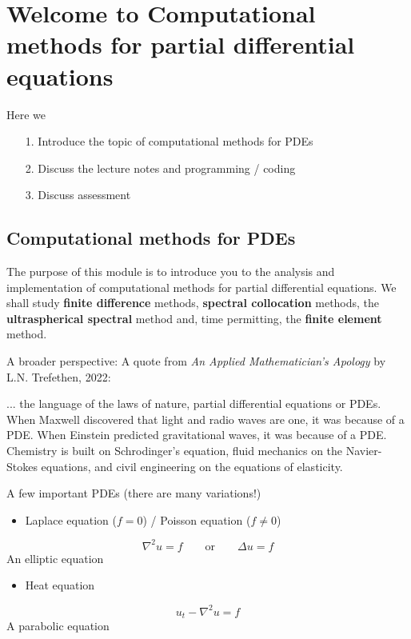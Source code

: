 \documentclass[12pt,a4paper]{article}
\begin{document}
\section{Welcome to Computational methods for partial differential equations}
Here we

\begin{itemize}
\item[1. ] Introduce the topic of computational methods for PDEs


\item[2. ] Discuss the lecture notes and programming / coding


\item[3. ] Discuss assessment

\end{itemize}
\subsection{Computational methods for PDEs}
The purpose of this module is to introduce you to the analysis and implementation of computational methods for partial differential equations.  We shall study \textbf{finite difference} methods, \textbf{spectral collocation} methods, the \textbf{ultraspherical spectral} method and, time permitting, the \textbf{finite element} method.  

A broader perspective: A quote from \emph{An Applied Mathematician's Apology} by L.N. Trefethen, 2022:

... the language of the laws of nature, partial differential equations or PDEs. When Maxwell discovered that light and radio waves are one, it was because of a PDE. When Einstein predicted gravitational waves, it was because     of a PDE. Chemistry is built on Schrodinger's equation, fluid mechanics on the Navier-Stokes equations, and civil engineering on the equations of elasticity.

A few important PDEs (there are many variations!)

\begin{itemize}
\item Laplace equation ($f = 0$) / Poisson equation ($f \neq 0$) 

\end{itemize}
\[
\nabla^2 u = f   \qquad \text{or} \qquad \Delta u = f
\]
An elliptic equation

\begin{itemize}
\item Heat equation

\end{itemize}
\[
 u_t - \nabla^2 u = f 
\]
A parabolic equation
\end{document}
